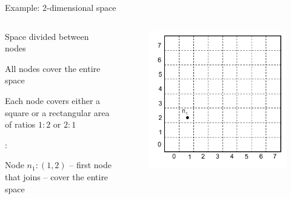 \begin{frame}{Example: 2-dimensional space}

\begin{columns}
\begin{column}{0.5\textwidth}
\BIL
\item Space divided between nodes
\item All nodes cover the entire space
\item Each node covers either a square or a rectangular area of ratios $1:2$ or $2:1$
\EIL

\smallskip
{}:\\
\BI
	\item Node $n_1:(1, 2)$ -- first node that joins -- cover the entire space
\EI
\end{column}
\begin{column}{0.5\textwidth}
\begin{figure}
	\includegraphics[width=1.0\textwidth]{figs/10/can1}
\end{figure}
\end{column}
\end{columns}
		
\end{frame}	


